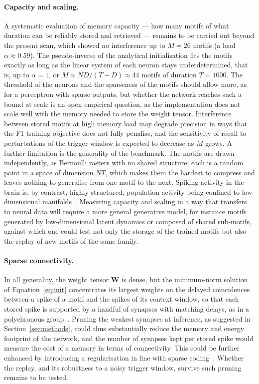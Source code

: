 \documentclass{scrartcl}
\newcommand{\citep}[1]{\parencite{#1}}
\begin{document}
\paragraph{Capacity and scaling.}
A systematic evaluation of memory capacity --- how many motifs of what duration can be reliably stored and retrieved --- remains to be carried out beyond the present scan, which showed no interference up to $M = 26$ motifs (a load $\alpha \approx 0.59$). The pseudo-inverse of the analytical initialisation fits the motifs exactly as long as the linear system of each neuron stays underdetermined, that is, up to $\alpha = 1$, or $M \approx N D / (T - D) \approx 44$ motifs of duration $T = 1000$. The threshold of the neurons and the sparseness of the motifs should allow more, as for a perceptron with sparse outputs, but whether the network reaches such a bound at scale is an open empirical question, as the implementation does not scale well with the memory needed to store the weight tensor. Interference between stored motifs at high memory load may degrade precision in ways that the F1 training objective does not fully penalise, and the sensitivity of recall to perturbations of the trigger window is expected to decrease as $M$ grows. A further limitation is the generality of the benchmark. The motifs are drawn independently, as Bernoulli rasters with no shared structure: each is a random point in a space of dimension $NT$, which makes them the hardest to compress and leaves nothing to generalise from one motif to the next. Spiking activity in the brain is, by contrast, highly structured, population activity being confined to low-dimensional manifolds~\citep{Gallego2017}. Measuring capacity and scaling in a way that transfers to neural data will require a more general generative model, for instance motifs generated by low-dimensional latent dynamics or composed of shared sub-motifs, against which one could test not only the storage of the trained motifs but also the replay of new motifs of the same family.

\paragraph{Sparse connectivity.}
In all generality, the weight tensor $\mathbf{W}$ is dense, but the minimum-norm solution of Equation~\ref{eq:init} concentrates its largest weights on the delayed coincidences between a spike of a motif and the spikes of its context window, so that each stored spike is supported by a handful of synapses with matching delays, as in a polychronous group~\citep{Izhikevich2006}. Pruning the weakest synapses at inference, as suggested in Section~\ref{sec:methods}, could thus substantially reduce the memory and energy footprint of the network, and the number of synapses kept per stored spike would measure the cost of a memory in terms of connectivity. This could be further enhanced by introducing a regularisation in line with sparse coding~\citep{Perrinet2002image}. Whether the replay, and its robustness to a noisy trigger window, survive such pruning remains to be tested.
\end{document}
